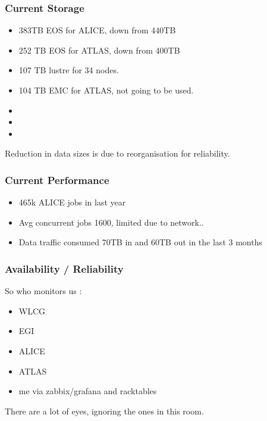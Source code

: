 \documentclass{beamer}
\begin{document}
\begin{frame}
  \frametitle{Current Storage}
  \begin{itemize}
    \item 383TB EOS for ALICE, down from 440TB
    \item 252 TB EOS for ATLAS, down from 400TB
    \item 107 TB lustre for 34 nodes.
    \item 104 TB EMC for ATLAS, not going to be used.
    \item \color{red}{400TB ALICE}
    \item \color{red}{400TB ATLAS}
    \item \color{red}{400TB General EOS}
  \end{itemize}
Reduction in data sizes is due to reorganisation for reliability.
\end{frame}


\begin{frame}
  \frametitle{Current Performance}
\begin{itemize}
  \item 465k ALICE jobs in last year
  \item Avg concurrent jobs 1600, limited due to network..
  \item Data traffic consumed 70TB in and 60TB out in the last 3 months
\end{itemize}

\end{frame}

\begin{frame}
  \frametitle{Availability / Reliability}
  So who monitors us :
  \begin{itemize}
    \item WLCG
    \item EGI
    \item ALICE
    \item ATLAS
    \item me via zabbix/grafana and racktables
  \end{itemize}
There are a lot of eyes, ignoring the ones in this room.\\
\vspace{0.5cm}
\\
\vspace{0.5cm}
\end{frame}
\end{document}
